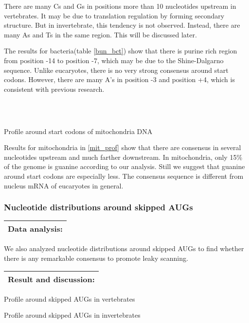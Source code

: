 There are many Cs and Gs in positions more than 10 nucleotides upstream
in vertebrates. It may be due to translation regulation by forming 
secondary structure. But in invertebrate, this tendency is not observed.
Instead, there are many As and Ts in the same region. This will be
discussed later.

The results for bacteria(table \ref{bun_bct}) show that there is purine rich
region from  
position -14 to position -7, which may be due to the Shine-Dalgarno 
sequence. Unlike eucaryotes, there is no very strong consensus around
start codons. However, there are many A's in position -3 and position 
+4, which is consistent with previous research.


\begin{table}
\\ \\
\caption{Profile around start codons of mitochondria DNA}
\label{mit_prof}
\end{table}

Results for mitochondria in \ref{mit_prof} show that there are
consensus in several 
nucleotides upstream and much farther downstream. In mitochondria, only 15\%
of the genome is guanine according to our analysis. Still we suggest that 
guanine around start codons are especially less. The consensus
sequence is different from nucleus mRNA of eucaryotes in general.

\subsubsection{Nucleotide distributions around skipped AUGs}

\vspace{2ex}
\noindent
\begin{tabular}{|l|}
\hline
Data analysis:\\
\hline
\end{tabular}

We also analyzed nucleotide distributions around skipped AUGs to find
whether there is any remarkable consensus to promote leaky scanning.

\vspace{2ex}
\noindent
\begin{tabular}{|l|}
\hline
Result and discussion:\\
\hline
\end{tabular}

\begin{table}
\caption{Profile around skipped AUGs in vertebrates}
\label{lk_vrta}
\end{table}
\begin{table}
\caption{Profile around skipped AUGs in invertebrates}
\label{lk_invrta}
\end{table}

